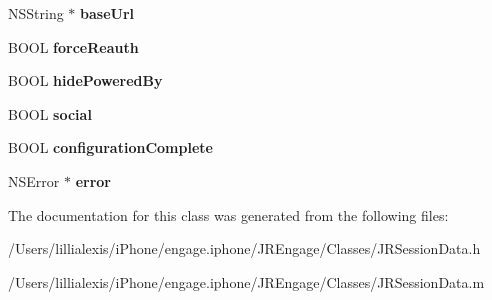 \begin{DoxyCompactItemize}
\item 
\hypertarget{interface_j_r_session_data_a3e5c9e83b91de4551a43c326d3f8942e}{
NSString $\ast$ {\bfseries baseUrl}}
\label{interface_j_r_session_data_a3e5c9e83b91de4551a43c326d3f8942e}

\item 
\hypertarget{interface_j_r_session_data_aa308ffcae19f58d6023dd38a31db3cbe}{
BOOL {\bfseries forceReauth}}
\label{interface_j_r_session_data_aa308ffcae19f58d6023dd38a31db3cbe}

\item 
\hypertarget{interface_j_r_session_data_a110d0eaabe2cbd79568f22e2e4768a8e}{
BOOL {\bfseries hidePoweredBy}}
\label{interface_j_r_session_data_a110d0eaabe2cbd79568f22e2e4768a8e}

\item 
\hypertarget{interface_j_r_session_data_aa351bdd559970dd596cd0384eed98c3c}{
BOOL {\bfseries social}}
\label{interface_j_r_session_data_aa351bdd559970dd596cd0384eed98c3c}

\item 
\hypertarget{interface_j_r_session_data_ab6e6ccdb8d6e44691d7303e49bad24ce}{
BOOL {\bfseries configurationComplete}}
\label{interface_j_r_session_data_ab6e6ccdb8d6e44691d7303e49bad24ce}

\item 
\hypertarget{interface_j_r_session_data_afac096f1987f2d7d0613b6a41e4d366c}{
NSError $\ast$ {\bfseries error}}
\label{interface_j_r_session_data_afac096f1987f2d7d0613b6a41e4d366c}

\end{DoxyCompactItemize}


The documentation for this class was generated from the following files:\begin{DoxyCompactItemize}
\item 
/Users/lillialexis/iPhone/engage.iphone/JREngage/Classes/JRSessionData.h\item 
/Users/lillialexis/iPhone/engage.iphone/JREngage/Classes/JRSessionData.m\end{DoxyCompactItemize}
